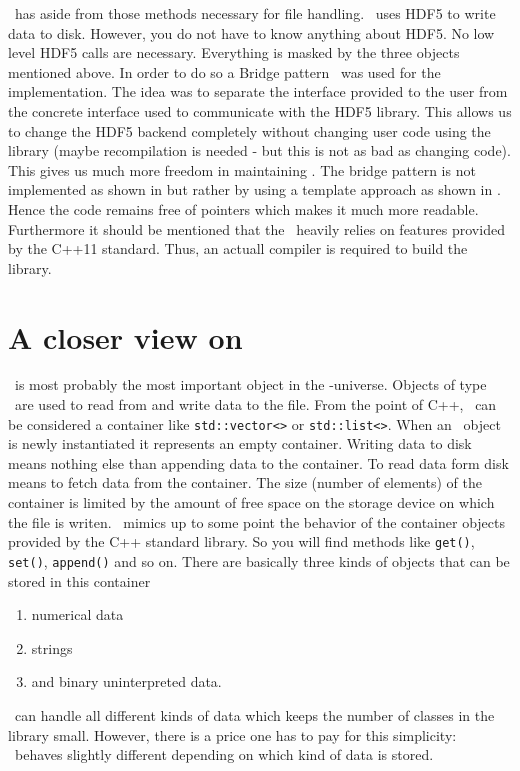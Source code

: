 \nxgroup\ has aside from those methods necessary for file handling. 
\pninx\ uses HDF5 to write data to disk. However, you do not have to know 
anything about HDF5. No low level HDF5 calls are necessary. Everything is 
masked by the three objects mentioned above. 
In order to do so a Bridge pattern~\cite{book:gof} was used for the
implementation. The idea was to separate the interface provided to the user from the 
concrete interface used to communicate with the HDF5 library. 
This allows us to change the HDF5 backend completely without changing 
user code using the library (maybe recompilation is needed - but this is not as
bad as changing code). This gives us much more freedom in maintaining \pninx.
The bridge pattern is not implemented as shown in \cite{book:gof} but rather 
by using a template approach as shown  in \cite{book:alexandrescu}.
Hence the code remains free of pointers which makes it much more readable. 
Furthermore it should be mentioned that the \pninx\ heavily relies on features 
provided by the C++11 standard. Thus, an actuall compiler is required to 
build the library.
 

\section{A closer view on \nxfield}\label{section:nxfield_design}
\nxfield\ is most probably the most important object in the \pninx-universe. 
Objects of type \nxfield\ are used to read from and write data to the file. 
From the point of C++, \nxfield\ can be considered a container like 
{\tt std::vector<>} or {\tt std::list<>}.
When an \nxfield\ object is newly instantiated it represents an empty container. 
Writing data to disk means nothing else than appending data to the container. 
To read data form disk means to fetch data from the container.
The size (number of elements) of the container is limited by the amount of 
free space on the storage device on which the file is writen.
\nxfield\ mimics up to some point the behavior of the container objects
provided by the C++ standard library. So you will find methods like 
{\tt get()}, {\tt set()}, {\tt append()} and so on. 
There are basically three kinds of objects that can be stored in this container
\begin{enumerate}
  \item numerical data
  \item strings
  \item and binary uninterpreted data.
\end{enumerate}
\nxfield\ can handle all different kinds of data which keeps the number of 
classes in the library small. However, there is a price one has to pay 
for this simplicity: \nxfield\ behaves slightly different depending 
on which kind of data is stored. 

